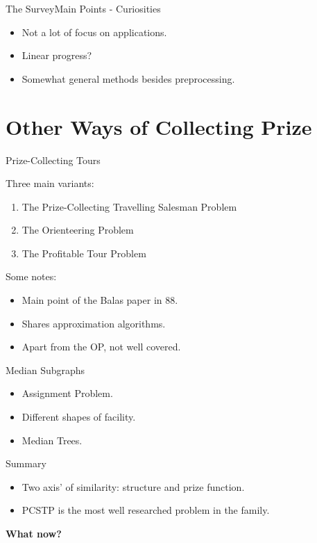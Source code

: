 \documentclass[rgb,dvipsnames]{beamer}
\begin{document}
\begin{frame}{The Survey}{Main Points - Curiosities}
  \begin{itemize}
  \item Not a lot of focus on applications.
  \item Linear progress?
  \item Somewhat general methods besides preprocessing.
  \end{itemize}
\end{frame}

\section{Other Ways of Collecting Prize}
\begin{frame}{Prize-Collecting Tours}
  \begin{block}{Three main variants:}
    \begin{enumerate}
    \item The Prize-Collecting Travelling Salesman Problem
    \item The Orienteering Problem
    \item The Profitable Tour Problem
    \end{enumerate}
  \end{block}
  \pause
  Some notes:
  \begin{itemize}
  \item Main point of the Balas paper in 88.
  \item Shares approximation algorithms.
  \item Apart from the OP, not well covered.
  \end{itemize}
\end{frame}

\begin{frame}{Median Subgraphs}
  \begin{itemize}
  \item Assignment Problem.
  \item Different shapes of facility.
  \item Median Trees.
  \end{itemize}
\end{frame}

\begin{frame}{Summary}
  \begin{itemize}
  \item Two axis' of similarity: structure and prize function.
  \item PCSTP is the most well researched problem in the family.
  \end{itemize}
  \pause
  \textbf{What now?}
\end{frame}
\end{document}
